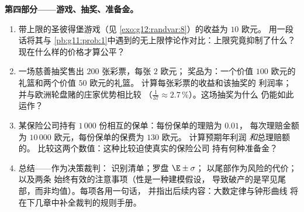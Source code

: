 \begin{problem}
\medskip
\noindent\textbf{第四部分——游戏、抽奖、准备金。}
\begin{enumerate}[resume]
  \item 带上限的圣彼得堡游戏（见
        \cref{exo:g12:randvar:8}）的收益为 $10$ 欧元。
        用一段话将其与
        \cref{pb:g11:prob:1}中遇到的无上限悖论作对比：上限究竟抑制了什么？
        现在什么样的价格才算公平？
  \item 一场慈善抽奖售出 $200$ 张彩票，每张 $2$ 欧元；
        奖品为：一个价值 $100$ 欧元的礼篮和两个价值 $50$ 欧元的礼篮。
        计算每张彩票的收益和该抽奖的
        利润率；并与欧洲轮盘赌的庄家优势相比较
        （$\frac{1}{37} \approx 2.7\,\%$）。这场抽奖为什么
        仍能如此运作？
  \item 某保险公司持有 $1\,000$ 份相互的保单：每份保单的理赔为 $0.01$，
        每次理赔金额为 $10\,000$ 欧元，每份保单的保费为 $130$ 欧元。
        计算预期年利润
        \emph{和}总理赔额的。
        比较这两个数值：这种比较迫使真实的保险公司
        持有何种准备金？
  \item 总结——作为决策裁判：
        识别清单；罗盘 $\E \pm \sigma$；
        以尾部作为风险的代价；以及两条
        始终有效的注意事项（性是一种建模假设，
        导致破产的是罕见尾部，而非均值）。每项各用一句话，
        并指出后续内容：大数定律与钟形曲线
        将在下几章中补全裁判的规则手册。
\end{enumerate}
\end{problem}
